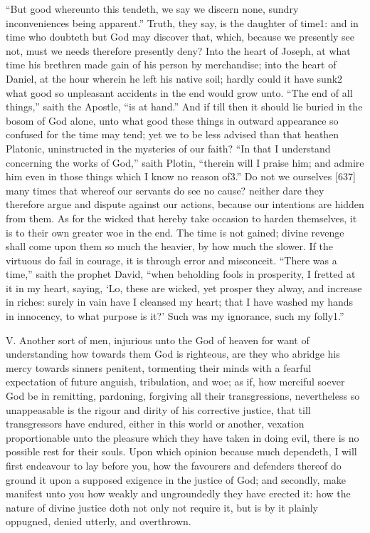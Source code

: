 “But good whereunto this tendeth, we say we discern none, sundry inconveniences being apparent.” Truth, they say, is the daughter of time1: and in time who doubteth but God may discover that, which, because we presently see not, must we needs therefore presently deny? Into the heart of Joseph, at what time his brethren made gain of his person by merchandise; into the heart of Daniel, at the hour wherein he left his native soil; hardly could it have sunk2 what good so unpleasant accidents in the end would grow unto. “The end of all things,” saith the Apostle, “is at hand.” And if till then it should lie buried in the bosom of God alone, unto what good these things in outward appearance so confused for the time may tend; yet we to be less advised than that heathen Platonic, uninstructed in the mysteries of our faith? “In that I understand concerning the works of God,” saith Plotin, “therein will I praise him; and admire him even in those things which I know no reason of3.” Do not we ourselves [637] many times that whereof our servants do see no cause? neither dare they therefore argue and dispute against our actions, because our intentions are hidden from them. As for the wicked that hereby take occasion to harden themselves, it is to their own greater woe in the end. The time is not gained; divine revenge shall come upon them so much the heavier, by how much the slower. If the virtuous do fail in courage, it is through error and misconceit. “There was a time,” saith the prophet David, “when beholding fools in prosperity, I fretted at it in my heart, saying, ‘Lo, these are wicked, yet prosper they alway, and increase in riches: surely in vain have I cleansed my heart; that I have washed my hands in innocency, to what purpose is it?’ Such was my ignorance, such my folly1.”

V.
Another sort of men, injurious unto the God of heaven for want of understanding how towards them God is righteous, are they who abridge his mercy towards sinners penitent, tormenting their minds with a fearful expectation of future anguish, tribulation, and woe; as if, how merciful soever God be in remitting, pardoning, forgiving all their transgressions, nevertheless so unappeasable is the rigour and dirity of his corrective justice, that till transgressors have endured, either in this world or another, vexation proportionable unto the pleasure which they have taken in doing evil, there is no possible rest for their souls. Upon which opinion because much dependeth, I will first endeavour to lay before you, how the favourers and defenders thereof do ground it upon a supposed exigence in the justice of God; and secondly, make manifest unto you how weakly and ungroundedly they have erected it: how the nature of divine justice doth not only not require it, but is by it plainly oppugned, denied utterly, and overthrown.


